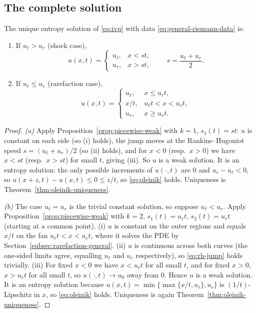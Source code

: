 \subsection{The complete solution}
\label{subsec:riemann-complete}

\begin{theorem}
\label{thm:riemann-solution}
The unique entropy solution of \eqref{eq:ivp} with data
\eqref{eq:general-riemann-data} is:
\begin{enumerate}
  \item[\textup{(a)}] If $u_\ell > u_r$ (shock case),
  \begin{equation}
    \label{eq:riemann-shock}
    u(x,t) = \begin{cases} u_\ell, & x < st, \\ u_r, & x > st, \end{cases}
    \qquad s = \frac{u_\ell+u_r}{2}.
  \end{equation}
  \item[\textup{(b)}] If $u_\ell \leq u_r$ (rarefaction case),
  \begin{equation}
    \label{eq:riemann-rarefaction}
    u(x,t) = \begin{cases}
      u_\ell, & x \le u_\ell t, \\
      x/t, & u_\ell t < x < u_r t, \\
      u_r, & x \ge u_r t.
    \end{cases}
  \end{equation}
\end{enumerate}
\end{theorem}

\begin{proof}
\emph{(a)} Apply Proposition~\ref{prop:piecewise-weak} with $k=1$,
$s_1(t)=st$: $u$ is constant on each side (so (i) holds), the jump moves at
the Rankine--Hugoniot speed $s=(u_\ell+u_r)/2$ (so (ii) holds), and for
$x<0$ (resp.\ $x>0$) we have $x<st$ (resp.\ $x>st$) for small $t$, giving
(iii). So $u$ is a weak solution. It is an entropy solution: the only
possible increments of $u(\cdot,t)$ are $0$ and $u_r-u_\ell<0$, so
$u(x+z,t)-u(x,t)\le0\le z/t$, so \eqref{eq:oleinik} holds.
Uniqueness is Theorem~\ref{thm:oleinik-uniqueness}.

\emph{(b)} The case $u_\ell=u_r$ is the trivial constant solution, so
suppose $u_\ell<u_r$. Apply Proposition~\ref{prop:piecewise-weak} with
$k=2$, $s_1(t)=u_\ell t$, $s_2(t)=u_r t$ (starting at a common point).
(i) $u$ is constant on the outer regions and equals $x/t$ on the fan
$u_\ell t<x<u_r t$, where it solves the PDE by
Section~\ref{subsec:rarefaction-general}. (ii) $u$ is continuous across
both curves (the one-sided limits agree, equalling $u_\ell$ and $u_r$
respectively), so \eqref{eq:rh-jump} holds trivially. (iii) For fixed
$x<0$ we have $x<u_\ell t$ for all small $t$, and for fixed $x>0$,
$x>u_rt$ for all small $t$, so $u(\cdot,t)\to u_0$ away from $0$. Hence
$u$ is a weak solution. It is an entropy solution because
$u(x,t)=\min\{\max\{x/t,u_\ell\},u_r\}$ is $(1/t)$-Lipschitz in $x$, so
\eqref{eq:oleinik} holds. Uniqueness is again
Theorem~\ref{thm:oleinik-uniqueness}.
\end{proof}

